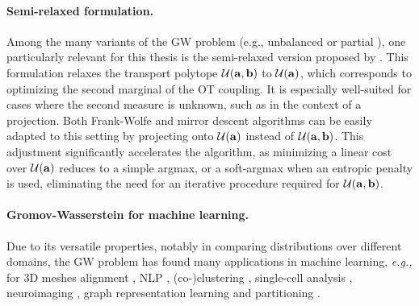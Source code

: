 \paragraph{Semi-relaxed formulation.} 
Among the many variants of the GW problem (e.g., unbalanced \citep{sejourne2021unbalanced} or partial \citep{chapel2020partial}), one particularly relevant for this thesis is the semi-relaxed version proposed by \cite{vincent2021semi}. This formulation relaxes the transport polytope ${\mathcal{U}}({\mathbf{a}}, {\mathbf{b}})$ to ${\mathcal{U}}({\mathbf{a}})$, which corresponds to optimizing the second marginal of the OT coupling. It is especially well-suited for cases where the second measure is unknown, such as in the context of a projection. Both Frank-Wolfe and mirror descent algorithms can be easily adapted to this setting by projecting onto ${\mathcal{U}}({\mathbf{a}})$ instead of ${\mathcal{U}}({\mathbf{a}}, {\mathbf{b}})$. This adjustment significantly accelerates the algorithm, as minimizing a linear cost over ${\mathcal{U}}({\mathbf{a}})$ reduces to a simple argmax, or a soft-argmax when an entropic penalty is used, eliminating the need for an iterative procedure required for ${\mathcal{U}}({\mathbf{a}}, {\mathbf{b}})$.


\paragraph{Gromov-Wasserstein for machine learning.}
Due to its versatile properties, notably in comparing distributions over different domains,  the GW problem has found many applications in machine learning, \textit{e.g.,} for 3D meshes alignment \citep{solomon2016entropic,ezuz2017gwcnn}, NLP \citep{alvarez2018gromov}, (co-)clustering  \citep{peyre2016gromov, redko2020co}, single-cell analysis \citep{demetci2020gromov}, neuroimaging \citep{thual2022aligning}, graph representation learning \citep{xu2020gromov, vincent2021online, liu2022robust, vincent2022template, pmlr-v202-zeng23c} and partitioning \citep{xu2019scalable, chowdhury2021generalized}.
